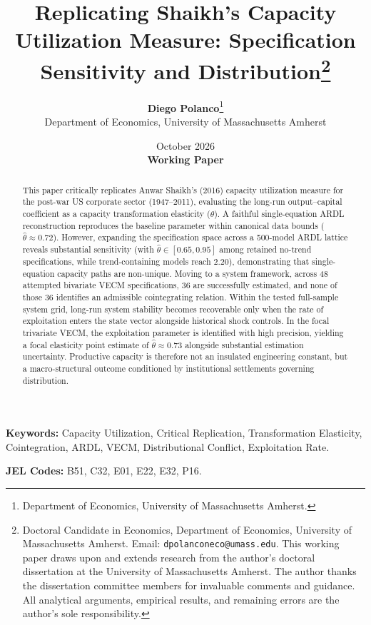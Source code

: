 \documentclass[11pt]{article}
\title{\textbf{Replicating Shaikh's Capacity Utilization Measure: Specification Sensitivity and Distribution}\thanks{Doctoral Candidate in Economics, Department of Economics, University of Massachusetts Amherst. Email: \texttt{dpolanconeco@umass.edu}. This working paper draws upon and extends research from the author's doctoral dissertation at the University of Massachusetts Amherst. The author thanks the dissertation committee members for invaluable comments and guidance. All analytical arguments, empirical results, and remaining errors are the author's sole responsibility.}}
\author{\textbf{Diego Polanco}\thanks{Department of Economics, University of Massachusetts Amherst.} \\
Department of Economics, University of Massachusetts Amherst}
\date{October 2026 \\ \vspace{0.5em} \small\textbf{Working Paper}}
\begin{document}
\maketitle

\begin{abstract}
This paper critically replicates Anwar Shaikh's (2016) capacity utilization measure for the post-war US corporate sector (1947--2011), evaluating the long-run output--capital coefficient as a capacity transformation elasticity ($\theta$). A faithful single-equation ARDL reconstruction reproduces the baseline parameter within canonical data bounds ($\hat{\theta} \approx 0.72$). However, expanding the specification space across a 500-model ARDL lattice reveals substantial sensitivity (with $\hat{\theta} \in [0.65, 0.95]$ among retained no-trend specifications, while trend-containing models reach 2.20), demonstrating that single-equation capacity paths are non-unique. Moving to a system framework, across 48 attempted bivariate VECM specifications, 36 are successfully estimated, and none of those 36 identifies an admissible cointegrating relation. Within the tested full-sample system grid, long-run system stability becomes recoverable only when the rate of exploitation enters the state vector alongside historical shock controls. In the focal trivariate VECM, the exploitation parameter is identified with high precision, yielding a focal elasticity point estimate of $\hat{\theta} \approx 0.73$ alongside substantial estimation uncertainty. Productive capacity is therefore not an insulated engineering constant, but a macro-structural outcome conditioned by institutional settlements governing distribution.
\end{abstract}

\vspace{0.8em}
\noindent\textbf{Keywords:} Capacity Utilization, Critical Replication, Transformation Elasticity, Cointegration, ARDL, VECM, Distributional Conflict, Exploitation Rate.

\vspace{0.4em}
\noindent\textbf{JEL Codes:} B51, C32, E01, E22, E32, P16.

\clearpage







\clearpage
\begingroup
\setlength{\bibsep}{2.5pt}


\endgroup

\clearpage
\begin{appendices}

\clearpage

\end{appendices}
\end{document}
